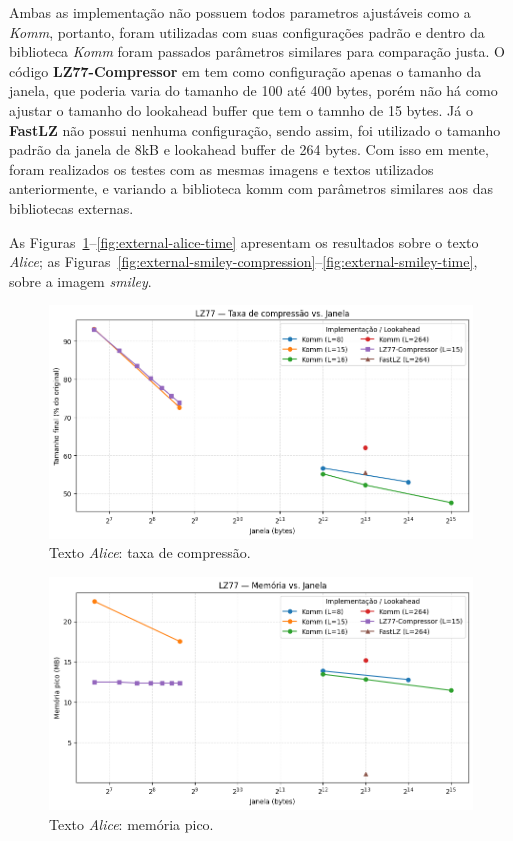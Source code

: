 Ambas as implementação não possuem todos parametros ajustáveis como a \textit{Komm}, portanto, foram utilizadas com suas configurações padrão e dentro da biblioteca \textit{Komm} foram passados parâmetros similares para comparação justa.
O código \textbf{LZ77-Compressor} em tem como configuração apenas o tamanho da janela, que poderia varia do tamanho de 100 até 400 bytes, porém não há como ajustar o tamanho do lookahead buffer que tem o tamnho de 15 bytes. Já o \textbf{FastLZ} não possui nenhuma configuração, sendo assim, foi utilizado o tamanho padrão da janela de 8kB e lookahead buffer de 264 bytes.
Com isso em mente, foram realizados os testes com as mesmas imagens e textos utilizados anteriormente, e variando a biblioteca komm com parâmetros similares aos das bibliotecas externas.

As Figuras~\ref{fig:external-alice-compression}–\ref{fig:external-alice-time} apresentam os resultados sobre o texto \textit{Alice}; as Figuras~\ref{fig:external-smiley-compression}–\ref{fig:external-smiley-time}, sobre a imagem \textit{smiley}.

\begin{figure}[h]
  \centering
  \caption{Texto \textit{Alice}: taxa de compressão.}
  \label{fig:external-alice-compression}
  \includegraphics[width=15cm]{figuras/lz77_alice_compression_window.png}
\end{figure}

\begin{figure}[h]
  \centering
  \caption{Texto \textit{Alice}: memória pico.}
  \label{fig:external-alice-memory}
  \includegraphics[width=15cm]{figuras/lz77_alice_memory_window.png}
\end{figure}

